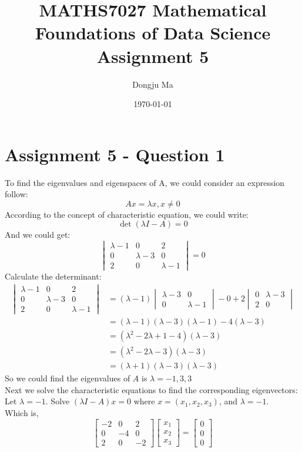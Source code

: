 \documentclass{article}
\title{MATHS7027 Mathematical Foundations of Data Science Assignment 5}
\author{Dongju Ma}
\date{\today}
\begin{document}
\maketitle  %

\section*{Assignment 5 - Question 1}
To find the eigenvalues and eigenspaces of A, we could consider an expression follow:
$$
Ax = \lambda x, x \neq 0
$$
According to the concept of characteristic equation, we could write:
$$
\det(\lambda I - A) = 0
$$
And we could get:
$$
\begin{vmatrix}
\lambda - 1 & 0 & 2 \\
0 & \lambda-3 & 0 \\
2 & 0 & \lambda - 1
\end{vmatrix}
=0
$$
Calculate the determinant:
$$
\begin{aligned}
\begin{vmatrix}
\lambda - 1 & 0 & 2 \\
0 & \lambda-3 & 0 \\
2 & 0 & \lambda - 1
\end{vmatrix}
&= 
(\lambda - 1)
\begin{vmatrix}
\lambda-3 & 0 \\
0 & \lambda - 1
\end{vmatrix}
-0
+2
\begin{vmatrix}
0 & \lambda-3 \\
2 & 0
\end{vmatrix}
\\
&= 
(\lambda - 1)(\lambda - 3)(\lambda - 1) - 4(\lambda - 3)
\\
&= 
(\lambda^2 - 2\lambda + 1 - 4)(\lambda - 3)
\\
&=
(\lambda^2 - 2\lambda - 3)(\lambda - 3)
\\
&=(\lambda + 1)(\lambda - 3)(\lambda - 3)
\end{aligned}
$$
So we could find the eigenvalues of $A$ is $\lambda = -1,3,3$ \\
Next we solve the characteristic equations to find the  corresponding eigenvectors: \\
Let $\lambda = -1$. Solve $(\lambda I - A)x = 0$ where $x = (x_1, x_2, x_3)$, and $\lambda = -1$. \\
Which is,  
$$
\begin{bmatrix}
-2 & 0 & 2 \\
0 & -4 & 0 \\
2 & 0 & -2
\end{bmatrix}
\begin{bmatrix}
x_1 \\
x_2 \\
x_3 
\end{bmatrix}=
\begin{bmatrix}
0 \\
0 \\
0
\end{bmatrix}
$$
\end{document}
